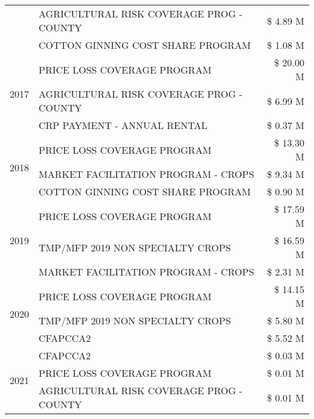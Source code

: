 \begin{tabular}{llr}
 & AGRICULTURAL RISK COVERAGE PROG - COUNTY      & \$ 4.89 M \\
 & COTTON GINNING COST SHARE PROGRAM             & \$ 1.08 M \\
\cline{1-3}
\multirow[t]{3}{*}{2017} & PRICE LOSS COVERAGE PROGRAM & \$ 20.00 M \\
 & AGRICULTURAL RISK COVERAGE PROG - COUNTY & \$ 6.99 M \\
 & CRP PAYMENT - ANNUAL RENTAL & \$ 0.37 M \\
\cline{1-3}
\multirow[t]{3}{*}{2018} & PRICE LOSS COVERAGE PROGRAM & \$ 13.30 M \\
 & MARKET FACILITATION PROGRAM - CROPS & \$ 9.34 M \\
 & COTTON GINNING COST SHARE PROGRAM & \$ 0.90 M \\
\cline{1-3}
\multirow[t]{3}{*}{2019} & PRICE LOSS COVERAGE PROGRAM & \$ 17.59 M \\
 & TMP/MFP 2019 NON SPECIALTY CROPS & \$ 16.59 M \\
 & MARKET FACILITATION PROGRAM - CROPS & \$ 2.31 M \\
\cline{1-3}
\multirow[t]{3}{*}{2020} & PRICE LOSS COVERAGE PROGRAM & \$ 14.15 M \\
 & TMP/MFP 2019 NON SPECIALTY CROPS & \$ 5.80 M \\
 & CFAPCCA2 & \$ 5.52 M \\
\cline{1-3}
\multirow[t]{3}{*}{2021} & CFAPCCA2 & \$ 0.03 M \\
 & PRICE LOSS COVERAGE PROGRAM & \$ 0.01 M \\
 & AGRICULTURAL RISK COVERAGE PROG - COUNTY & \$ 0.01 M \\
\cline{1-3}
\bottomrule
\end{tabular}
